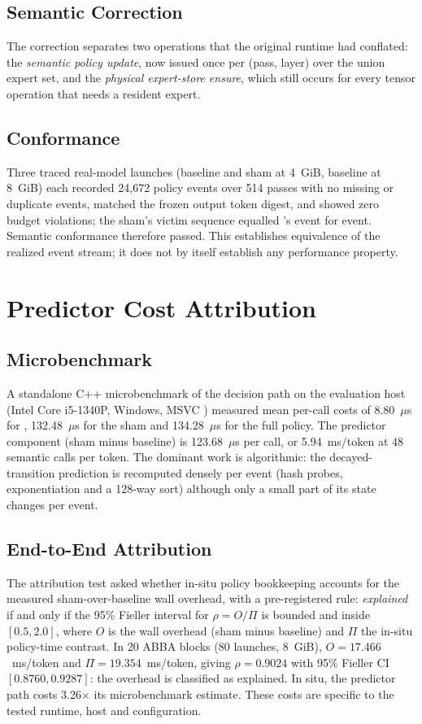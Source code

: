 \documentclass[11pt]{article}
\theoremstyle{plain}
\theoremstyle{definition}
\newcommand{\code}[1]{\texttt{\seqsplit{#1}}}
\begin{document}
\subsection{Semantic Correction}
The correction separates two operations that the original runtime had conflated: the \emph{semantic policy update}, now issued once per (pass, layer) over the union expert set, and the \emph{physical expert-store ensure}, which still occurs for every tensor operation that needs a resident expert.

\subsection{Conformance}
Three traced real-model launches (baseline and sham at 4~GiB, baseline at 8~GiB) each recorded 24{,}672 policy events over 514 passes with no missing or duplicate events, matched the frozen output token digest, and showed zero budget violations; the sham's victim sequence equalled \code{b\_selected}'s event for event. Semantic conformance therefore passed. This establishes equivalence of the realized event stream; it does not by itself establish any performance property.

\section{Predictor Cost Attribution}
\label{sec:cost}

\subsection{Microbenchmark}
A standalone C++ microbenchmark of the decision path on the evaluation host (Intel Core i5-1340P, Windows, MSVC \code{/O2 /arch:AVX2}) measured mean per-call costs of 8.80~$\mu$s for \code{b\_selected}, 132.48~$\mu$s for the sham and 134.28~$\mu$s for the full policy. The predictor component (sham minus baseline) is 123.68~$\mu$s per call, or 5.94~ms/token at 48 semantic calls per token. The dominant work is algorithmic: the decayed-transition prediction is recomputed densely per event (hash probes, exponentiation and a 128-way sort) although only a small part of its state changes per event.

\subsection{End-to-End Attribution}
The attribution test asked whether in-situ policy bookkeeping accounts for the measured sham-over-baseline wall overhead, with a pre-registered rule: \emph{explained} if and only if the 95\% Fieller interval for $\rho = O/\Pi$ is bounded and inside $[0.5, 2.0]$, where $O$ is the wall overhead (sham minus baseline) and $\Pi$ the in-situ policy-time contrast. In 20 ABBA blocks (80 launches, 8~GiB), $O = 17.466$~ms/token and $\Pi = 19.354$~ms/token, giving $\rho = 0.9024$ with 95\% Fieller CI $[0.8760, 0.9287]$: the overhead is classified as explained. In situ, the predictor path costs 3.26$\times$ its microbenchmark estimate. These costs are specific to the tested runtime, host and configuration.
\end{document}
